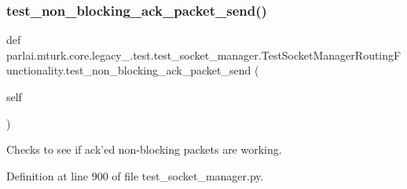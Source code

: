\subsubsection{\texorpdfstring{test\+\_\+non\+\_\+blocking\+\_\+ack\+\_\+packet\+\_\+send()}{test\_non\_blocking\_ack\_packet\_send()}}
{\footnotesize\ttfamily def parlai.\+mturk.\+core.\+legacy\+\_.\+test.\+test\+\_\+socket\+\_\+manager.\+Test\+Socket\+Manager\+Routing\+Functionality.\+test\+\_\+non\+\_\+blocking\+\_\+ack\+\_\+packet\+\_\+send (\begin{DoxyParamCaption}\item[{}]{self }\end{DoxyParamCaption})}

\begin{DoxyVerb}Checks to see if ack'ed non-blocking packets are working.
\end{DoxyVerb}
 

Definition at line 900 of file test\+\_\+socket\+\_\+manager.\+py.


